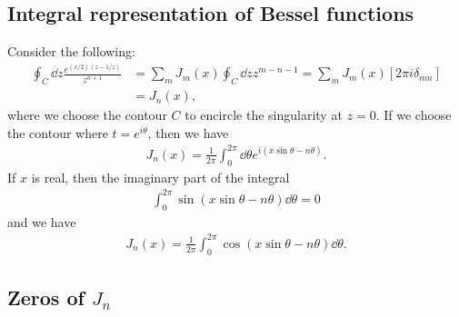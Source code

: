 \subsection{Integral representation of Bessel functions}

Consider the following:
\begin{align}
    \oint_{C} \dd{z} \frac{e^{(x/2)(z - 1/z)}}{z^{n+1}} &= \sum_{m} J_{m}(x) \oint_{C} \dd{z} z^{m-n-1} = \sum_{m} J_{m}(x) [ 2 \pi i \delta_{mn} ] \nonumber \\
                                                        &= J_{n}(x)
,\end{align}
where we choose the contour $C$ to encircle the singularity at $z = 0$.
If we choose the contour where $t = e^{i\theta}$, then we have
\begin{eqnarray}
    J_{n}(x) = \frac{1}{2 \pi} \int_{0}^{2\pi} \dd{\theta} e^{i(x\sin{\theta} - n\theta)}
.\end{eqnarray}
If $x$ is real, then the imaginary part of the integral 
\begin{eqnarray}
    \int_{0}^{2\pi} \sin(x\sin{\theta} - n\theta) \dd{\theta} = 0
\end{eqnarray}
and we have
\begin{eqnarray}
    J_{n}(x) = \frac{1}{2\pi} \int_{0}^{2\pi} \cos(x\sin{\theta} - n \theta) \dd{\theta}
.\end{eqnarray}

\subsection{Zeros of $J_{n}$}

